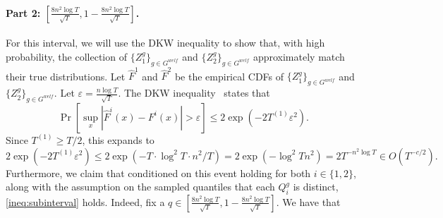 \paragraph{Part 2: $\left[\frac{8n^2\log T}{\sqrt{T}}, 1 - \frac{8n^2\log T}{\sqrt{T}} \right]$.} For this interval, we will use the DKW inequality to show that, with high probability, the collection of $\{Z^g_1\}_{g \in G^{welf}}$ and $\{Z^g_2\}_{g \in G^{welf}}$ approximately match their true distributions. Let $\hat{F}^1$ and $\hat{F}^2$ be the empirical CDFs of $\{Z^g_1\}_{g \in G^{welf}}$ and $\{Z^g_2\}_{g \in G^{welf}}$. Let $\varepsilon = \frac{n\log T}{\sqrt{T}}$. The DKW inequality~\cite{dvoretzky1956asymptotic} states that
        \[
            \Pr[\sup_x|\hat{F}^i(x) - F^i(x)| > \varepsilon] \le 2\exp(-2T^{(1)} \varepsilon^2).
        \]
        Since $T^{(1)} \ge T/2$, this expands to
        \[
            2\exp(-2T^{(1)} \varepsilon^2) \le 2\exp(-T \cdot \log^2 T \cdot n^2 / T) = 2\exp(-\log^2 T n^2) = 2T^{-n^2 \log T} \in O(T^{-c/2}).
        \]
        Furthermore, we claim that conditioned on this event holding for both $i \in \{1, 2\}$, along with the assumption on the sampled quantiles that each $Q^g_i$ is distinct, \eqref{ineq:subinterval} holds. Indeed, fix a $q \in \left[\frac{8n^2\log T}{\sqrt{T}}, 1 - \frac{8n^2\log T}{\sqrt{T}} \right]$. We have that
